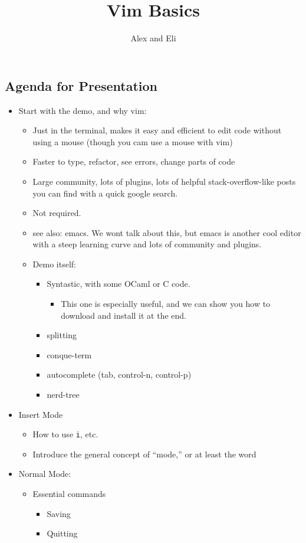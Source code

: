 \documentclass{article}
\title{Vim Basics}
\author{Alex and Eli}
\begin{document}
\subsection*{Agenda for Presentation}
\begin{itemize}
\item Start with the demo, and why vim:
\begin{itemize}
\item Just in the terminal, makes it easy and efficient to edit code without
		using a mouse (though you cam use a mouse with vim)
\item Faster to type, refactor, see errors, change parts of code
\item Large community, lots of plugins, lots of helpful stack-overflow-like posts
		you can find with a quick google search.
\item Not required.
\item see also: emacs. We wont talk about this, but emacs is another cool editor
		with a steep learning curve and lots of community and plugins.
\item Demo itself:
\begin{itemize}
\item Syntastic, with some OCaml or C code.
\begin{itemize}
\item This one is especially useful, and we can show you how to download and
				install it at the end.
\end{itemize}
\item splitting
\item conque-term
\item autocomplete (tab, control-n, control-p)
\item nerd-tree
\end{itemize}
\end{itemize}
\item Insert Mode
\begin{itemize}
\item How to use \verb|i|, etc.
\item Introduce the general concept of ``mode,'' or at least the word
\end{itemize}
\item Normal Mode:
\begin{itemize}
\item Essential commands
\begin{itemize}
\item Saving
\item Quitting
\end{itemize}

\end{itemize}
\end{itemize}
\end{document}
